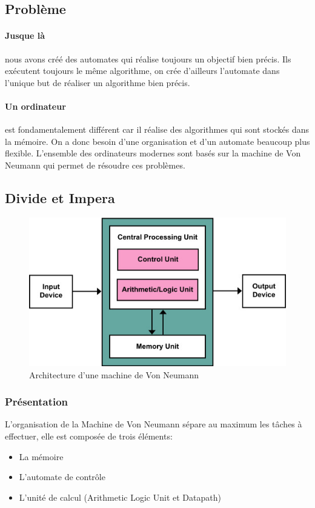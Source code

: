 \documentclass[10pt,a4paper,twoside]{article}
\begin{document}
\subsection{Problème}
\paragraph{Jusque là} nous avons créé des automates qui réalise toujours un objectif bien précis. Ils exécutent toujours le même algorithme, on crée d'ailleurs l'automate dans l'unique but de réaliser un algorithme bien précis.

\paragraph{Un ordinateur} est fondamentalement différent car il réalise des algorithmes qui sont stockés dans la mémoire. On a donc besoin d'une organisation et d'un automate beaucoup plus flexible. L'ensemble des ordinateurs modernes sont basés sur la machine de Von Neumann qui permet de résoudre ces problèmes.

\subsection{Divide et Impera}
\begin{figure}[hbtp]
\caption{Architecture d'une machine de Von Neumann}
\centering
\includegraphics[scale=0.5]{Von_Neumann_Architecture.jpg}
\end{figure}

\subsubsection{Présentation}
L'organisation de la Machine de Von Neumann sépare au maximum les tâches à effectuer, elle est composée de trois éléments:
\begin{itemize}
\item La mémoire
\item L'automate de contrôle
\item L'unité de calcul (Arithmetic Logic Unit et Datapath)
\end{itemize}
\end{document}

